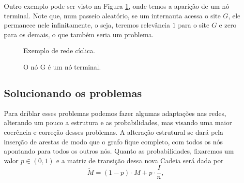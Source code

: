 \documentclass{article}
\begin{document}
Outro exemplo pode ser visto na Figura \ref{graph2}, onde temos a aparição de um nó terminal. Note que, num passeio aleatório, se um internauta acessa o site $G$, ele permanece nele infinitamente, o seja, teremos relevância $1$ para o site $G$ e zero para os demais, o que também seria um problema.
\begin{figure}[H]
    \centering
    \begin{minipage}{.5\textwidth}
        \centering
        \caption{Exemplo de rede cíclica.}
        \label{graph1}
    \end{minipage}%
    \begin{minipage}{.5\textwidth}
        \centering
        \caption{O nó G é um nó terminal.}
        \label{graph2}
    \end{minipage}
\end{figure}

\subsection*{Solucionando os problemas}

Para driblar esses problemas podemos fazer algumas adaptações nas redes, alterando um pouco a estrutura e as probabilidades, mas visando uma maior coerência e correção desses problemas. A alteração estrutural se dará pela inserção de arestas de modo que o grafo fique completo, com todos os nós apontando para todos os outros nós. Quanto as probabilidades, fixaremos um valor $p\in (0, 1)$ e a matriz de transição dessa nova Cadeia será dada por
\[\tilde{M} = (1 - p)\cdot M + p\cdot \dfrac{I}{n},\]
\end{document}
